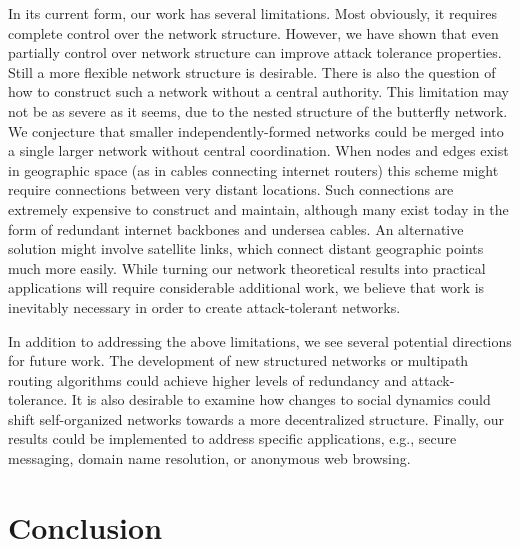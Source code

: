 \documentclass[10pt,letterpaper]{article}
\begin{document}
In its current form, our work has several limitations.
Most obviously, it requires complete control over the network structure.
However, we have shown that even partially control over network structure can
improve attack tolerance properties.
Still a more flexible network structure is desirable.
There is also the question of how to construct such a network without a central
authority.
This limitation may not be as severe as it seems,
due to the nested structure of the butterfly network.
We conjecture that smaller independently-formed networks could be
merged into a single larger network without central coordination.
When nodes and edges exist in geographic space (as in cables connecting internet
routers) this scheme might require connections between very distant locations.
Such connections are extremely expensive to construct and maintain,
although many exist today in the form of redundant internet backbones and
undersea cables. An alternative solution might involve satellite links,
which connect distant geographic points much more easily.
While turning our network theoretical results into practical applications
will require considerable additional work, we believe that work is inevitably
necessary in order to create attack-tolerant networks.

In addition to addressing the above limitations,
we see several potential directions for future work.
The development of new structured networks or multipath routing algorithms
could achieve higher levels of redundancy and attack-tolerance.
It is also desirable to examine how changes to social dynamics could shift
self-organized networks towards a more decentralized structure.
Finally, our results could be implemented to address specific applications, e.g.,
secure messaging, domain name resolution, or anonymous web browsing.

\section*{Conclusion}
\label{sec-conclusion}
\end{document}
